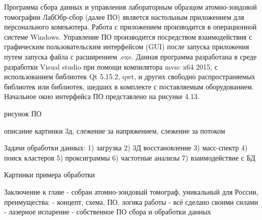 Программа сбора данных и управления лабораторным образцом атомно-зондовой томографии ЛабОбр-сбор (далее ПО) является настольным приложением для персонального компьютера. Работа с приложением производится в операционной системе Windows. Управление ПО производится посредством взаимодействия с графическим пользовательским интерфейсом (GUI) после запуска приложения путем запуска файла с расширением .exe. Данная программа разработана в среде разработки Visual studio при помощи компилятора mvsc x64 2015, с использованием библиотек Qt 5.15.2, qwt, и других свободно распространяемых библиотек или библиотек, шедших в комплекте с поставляемым оборудованием. Начальное окно интерфейса ПО представлено на рисунке 4.13.

рисунок ПО

описание картинки 3д, слежение за напряжением, слежение за потоком


Задачи обработки данных:
1) загрузка
2) 3Д восстановление
3) масс-спектр
4) поиск кластеров
5) проксиграммы
6) частотные анализы
7) взаимодействие с БД

Картинки примера обработки


\FloatBarrier

Заключение к главе - собран атомно-зондовый томограф, уникальный для России, преимущества:
- концепт, схема, ПО, логика работы - всё сделано своими силами
- лазерное испарение
- собственное ПО сбора и обработки данных










